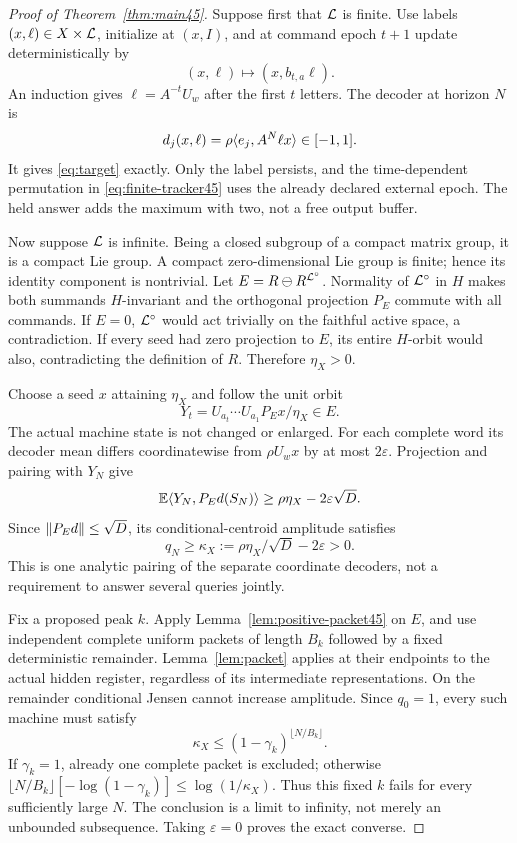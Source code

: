 \begin{proof}[Proof of Theorem~\ref{thm:main45}]
Suppose first that $\mathcal L$ is finite. Use labels $(x,\ell)\in X\times\mathcal L$, initialize at $(x,I)$, and at command epoch $t+1$ update deterministically by
\begin{equation}\label{eq:finite-tracker45}
 (x,\ell)\longmapsto(x,b_{t,a}\ell).
\end{equation}
An induction gives $\ell=A^{-t}U_w$ after the first $t$ letters. The decoder at horizon $N$ is
\[
 d_j(x,\ell)=\rho\langle e_j,A^N\ell x\rangle\in[-1,1].
\]
It gives \eqref{eq:target} exactly. Only the label persists, and the time-dependent permutation in \eqref{eq:finite-tracker45} uses the already declared external epoch. The held answer adds the maximum with two, not a free output buffer.

Now suppose $\mathcal L$ is infinite. Being a closed subgroup of a compact matrix group, it is a compact Lie group. A compact zero-dimensional Lie group is finite; hence its identity component is nontrivial. Let $E=R\ominus R^{\mathcal L^\circ}$. Normality of $\mathcal L^\circ$ in $H$ makes both summands $H$-invariant and the orthogonal projection $P_E$ commute with all commands. If $E=0$, $\mathcal L^\circ$ would act trivially on the faithful active space, a contradiction. If every seed had zero projection to $E$, its entire $H$-orbit would also, contradicting the definition of $R$. Therefore $\eta_X>0$.

Choose a seed $x$ attaining $\eta_X$ and follow the unit orbit
\[
 Y_t=U_{a_t}\cdots U_{a_1}P_E x/\eta_X\in E.
\]
The actual machine state is not changed or enlarged. For each complete word its decoder mean differs coordinatewise from $\rho U_wx$ by at most $2\varepsilon$. Projection and pairing with $Y_N$ give
\[
 \mathbb E\langle Y_N,P_Ed(S_N)\rangle\ge\rho\eta_X-2\varepsilon\sqrt D.
\]
Since $\lVert P_Ed\rVert\le\sqrt D$, its conditional-centroid amplitude satisfies
\begin{equation}\label{eq:activated-calibration45}
 q_N\ge\kappa_X:=\rho\eta_X/\sqrt D-2\varepsilon>0.
\end{equation}
This is one analytic pairing of the separate coordinate decoders, not a requirement to answer several queries jointly.

Fix a proposed peak $k$. Apply Lemma~\ref{lem:positive-packet45} on $E$, and use independent complete uniform packets of length $B_k$ followed by a fixed deterministic remainder. Lemma~\ref{lem:packet} applies at their endpoints to the actual hidden register, regardless of its intermediate representations. On the remainder conditional Jensen cannot increase amplitude. Since $q_0=1$, every such machine must satisfy
\begin{equation}\label{eq:threshold45}
 \kappa_X\le(1-\gamma_k)^{\lfloor N/B_k\rfloor}.
\end{equation}
If $\gamma_k=1$, already one complete packet is excluded; otherwise
$\lfloor N/B_k\rfloor[-\log(1-\gamma_k)]\le\log(1/\kappa_X)$.
Thus this fixed $k$ fails for every sufficiently large $N$. The conclusion is a limit to infinity, not merely an unbounded subsequence. Taking $\varepsilon=0$ proves the exact converse.
\end{proof}

